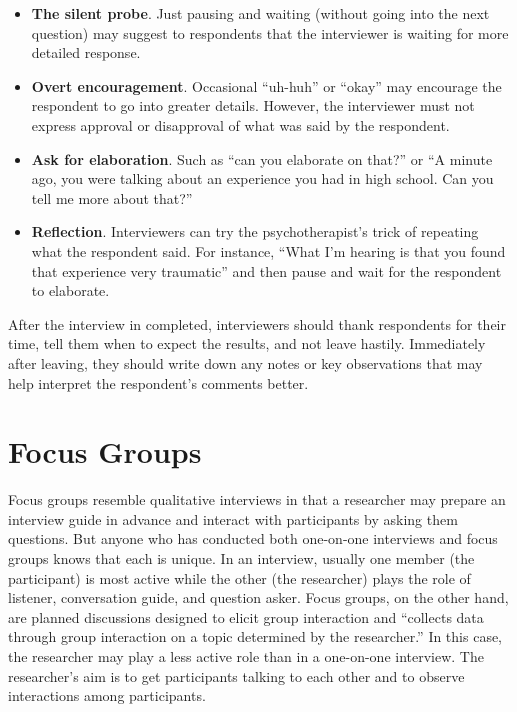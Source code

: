 \begin{itemize}
	\item \textbf{The silent probe}. Just pausing and waiting (without going into the next question) may suggest to respondents that the interviewer is waiting for more detailed response.
	\item \textbf{Overt encouragement}. Occasional ``uh-huh'' or ``okay'' may encourage the respondent to go into greater details. However, the interviewer must not express approval or disapproval of what was said by the respondent.
	\item \textbf{Ask for elaboration}. Such as ``can you elaborate on that?'' or ``A minute ago, you were talking about an experience you had in high school. Can you tell me more about that?''
	\item \textbf{Reflection}. Interviewers can try the psychotherapist's trick of repeating what the respondent said. For instance, ``What I'm hearing is that you found that experience very traumatic'' and then pause and wait for the respondent to elaborate.
\end{itemize}

After the interview in completed, interviewers should thank respondents for their time, tell them when to expect the results, and not leave hastily. Immediately after leaving, they should write down any notes or key observations that may help interpret the respondent's comments better.

\section{Focus Groups}

Focus groups resemble qualitative interviews in that a researcher may prepare an interview guide in advance and interact with participants by asking them questions. But anyone who has conducted both one-on-one interviews and focus groups knows that each is unique. In an interview, usually one member (the participant) is most active while the other (the researcher) plays the role of listener, conversation guide, and question asker. Focus groups, on the other hand, are planned discussions designed to elicit group interaction and ``collects data through group interaction on a topic determined by the researcher.'' \cite{morgan1996focus} In this case, the researcher may play a less active role than in a one-on-one interview. The researcher's aim is to get participants talking to each other and to observe interactions among participants.

